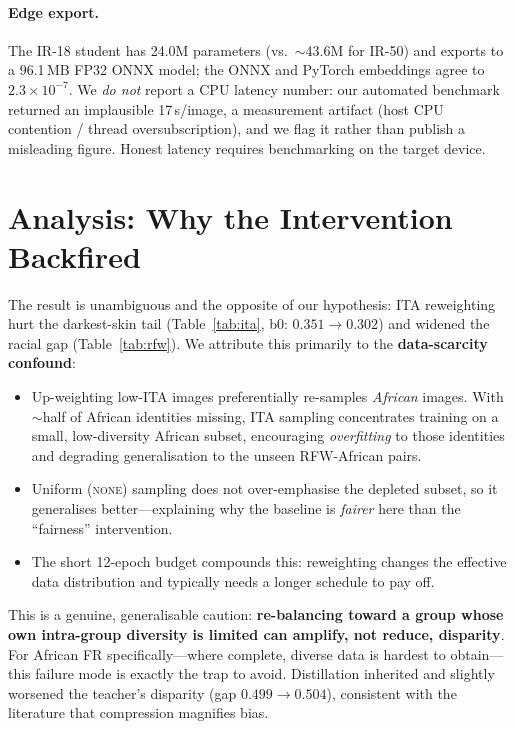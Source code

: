 \documentclass[10pt,twocolumn]{article}
\begin{document}
\paragraph{Edge export.} The IR-18 student has 24.0M parameters (vs.\
$\sim$43.6M for IR-50) and exports to a 96.1\,MB FP32 ONNX model; the ONNX and
PyTorch embeddings agree to $2.3\times10^{-7}$. We \emph{do not} report a CPU
latency number: our automated benchmark returned an implausible 17\,s/image, a
measurement artifact (host CPU contention / thread oversubscription), and we
flag it rather than publish a misleading figure. Honest latency requires
benchmarking on the target device.

\section{Analysis: Why the Intervention Backfired}
The result is unambiguous and the opposite of our hypothesis: ITA reweighting
hurt the darkest-skin tail (Table~\ref{tab:ita}, b0: $0.351\!\rightarrow\!0.302$)
and widened the racial gap (Table~\ref{tab:rfw}). We attribute this primarily to
the \textbf{data-scarcity confound}:

\begin{itemize}\itemsep2pt
\item Up-weighting low-ITA images preferentially re-samples \emph{African}
images. With $\sim$half of African identities missing, ITA sampling concentrates
training on a small, low-diversity African subset, encouraging
\emph{overfitting} to those identities and degrading generalisation to the
unseen RFW-African pairs.
\item Uniform (\textsc{none}) sampling does not over-emphasise the depleted
subset, so it generalises better---explaining why the baseline is \emph{fairer}
here than the ``fairness'' intervention.
\item The short 12-epoch budget compounds this: reweighting changes the
effective data distribution and typically needs a longer schedule to pay off.
\end{itemize}

This is a genuine, generalisable caution: \textbf{re-balancing toward a group
whose own intra-group diversity is limited can amplify, not reduce, disparity}.
For African FR specifically---where complete, diverse data is hardest to
obtain---this failure mode is exactly the trap to avoid. Distillation inherited
and slightly worsened the teacher's disparity (gap $0.499\!\rightarrow\!0.504$),
consistent with the literature that compression magnifies bias.
\end{document}
